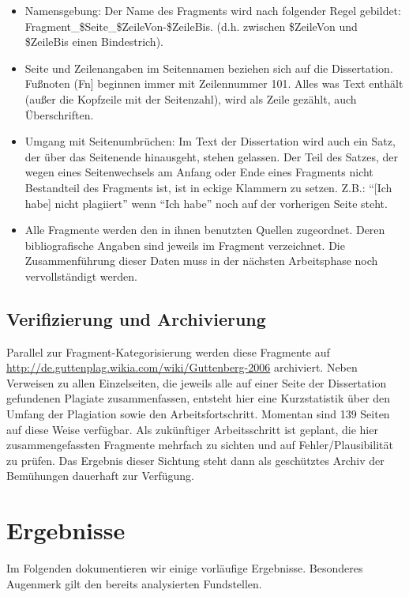 \documentclass[ngerman,final,fontsize=12pt,paper=a4,twoside,BCOR=8mm,draft=false]{scrartcl}
\begin{document}
\begin{itemize}
\item Namensgebung: Der Name des Fragments wird nach folgender Regel
  gebildet: Fragment\_\$Seite\_\$ZeileVon-\$ZeileBis. (d.h. zwischen
  \$ZeileVon und \$ZeileBis einen Bindestrich).
\item Seite und Zeilenangaben im Seitennamen beziehen sich auf die Dissertation. Fußnoten (Fn] beginnen immer mit Zeilennummer 101. Alles was Text enthält (außer die Kopfzeile mit der Seitenzahl), wird als Zeile gezählt, auch Überschriften.
\item Umgang mit Seitenumbrüchen: Im Text der Dissertation wird auch ein Satz, der über das Seitenende hinausgeht, stehen gelassen. Der Teil des Satzes, der wegen eines Seitenwechsels am Anfang oder Ende eines Fragments nicht Bestandteil des Fragments ist, ist in eckige Klammern zu setzen. Z.B.: "`[Ich habe] nicht plagiiert"' wenn "`Ich habe"' noch auf der vorherigen Seite steht.
\item Alle Fragmente werden den in ihnen benutzten Quellen zugeordnet. Deren bibliografische Angaben sind jeweils im Fragment verzeichnet. Die Zusammenführung dieser Daten muss in der nächsten Arbeitsphase noch vervollständigt werden.
\end{itemize}

\subsection{Verifizierung und Archivierung}
Parallel zur Fragment-Kategorisierung werden diese Fragmente auf \url{http://de.guttenplag.wikia.com/wiki/Guttenberg-2006} archiviert. Neben Verweisen zu allen Einzelseiten, die jeweils alle auf einer Seite der Dissertation gefundenen Plagiate zusammenfassen, entsteht hier eine Kurzstatistik über den Umfang der Plagiation sowie den Arbeitsfortschritt. Momentan sind 139 Seiten auf diese Weise verfügbar. 
Als zukünftiger Arbeitsschritt ist geplant, die hier zusammengefassten Fragmente mehrfach zu sichten und auf Fehler/Plausibilität zu prüfen. Das Ergebnis dieser Sichtung steht dann als geschütztes Archiv der Bemühungen dauerhaft zur Verfügung.

\newpage

\section{Ergebnisse}
Im Folgenden dokumentieren wir einige vorläufige Ergebnisse. Besonderes Augenmerk gilt den bereits analysierten Fundstellen.
\end{document}
